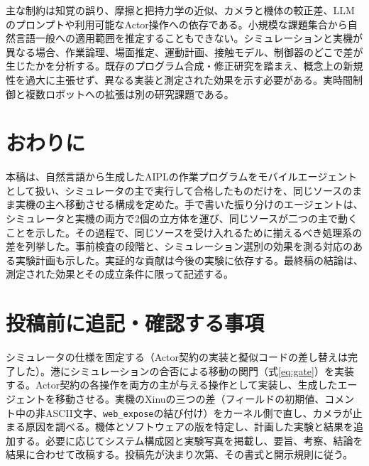 \documentclass[10pt,letterpaper]{article}
\begin{document}
主な制約は知覚の誤り、摩擦と把持力学の近似、カメラと機体の較正差、LLMのプロンプトや利用可能なActor操作への依存である。小規模な課題集合から自然言語一般への適用範囲を推定することもできない。シミュレーションと実機が異なる場合、作業論理、場面推定、運動計画、接触モデル、制御器のどこで差が生じたかを分析する。既存のプログラム合成・修正研究を踏まえ、概念上の新規性を過大に主張せず、異なる実装と測定された効果を示す必要がある\cite{holtz2021,wang2025}。実時間制御と複数ロボットへの拡張は別の研究課題である。

\section{おわりに}
本稿は、自然言語から生成したAIPLの作業プログラムをモバイルエージェントとして扱い、シミュレータの主で実行して合格したものだけを、同じソースのまま実機の主へ移動させる構成を定めた。手で書いた振り分けのエージェントは、シミュレータと実機の両方で2個の立方体を運び、同じソースが二つの主で動くことを示した。その過程で、同じソースを受け入れるために揃えるべき処理系の差を列挙した。事前検査の段階と、シミュレーション選別の効果を測る対応のある実験計画も示した。実証的な貢献は今後の実験に依存する。最終稿の結論は、測定された効果とその成立条件に限って記述する。

\section*{投稿前に追記・確認する事項}
シミュレータの仕様を固定する（Actor契約の実装と擬似コードの差し替えは完了した）。港にシミュレーションの合否による移動の関門（式\eqref{eq:gate}）を実装する。Actor契約の各操作を両方の主が与える操作として実装し、生成したエージェントを移動させる。実機のXinuの三つの差（フィールドの初期値、コメント中の非ASCII文字、\texttt{web\_expose}の結び付け）をカーネル側で直し、カメラが止まる原因を調べる。機体とソフトウェアの版を特定し、計画した実験と結果を追加する。必要に応じてシステム構成図と実験写真を掲載し、要旨、考察、結論を結果に合わせて改稿する。投稿先が決まり次第、その書式と開示規則に従う。
\end{document}

